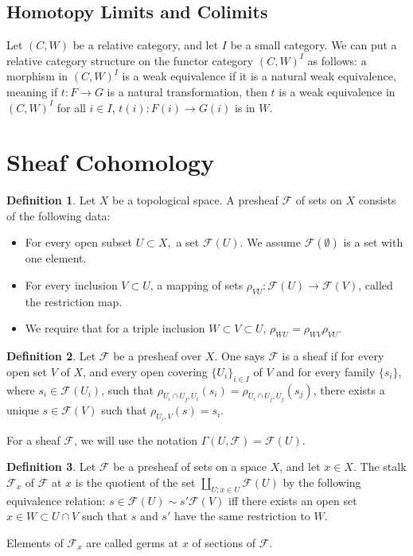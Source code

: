 \documentclass{article}
\theoremstyle{definition}
\newtheorem{defn}{Definition}[section]
\begin{document}
\subsection{Homotopy Limits and Colimits}
Let $(C,W)$ be a relative category, and let $I$ be a small category. We can put a relative category structure on the functor category $(C,W)^{I}$ as follows: a morphism in $(C,W)^{I}$ is a weak equivalence if it is a natural weak equivalence, meaning if $t:F\rightarrow G$ is a natural transformation, then $t$ is a weak equivalence in $(C,W)^{I}$ for all $i\in I$, $t(i):F(i)\rightarrow G(i)$ is in $W$. 
    \section{Sheaf Cohomology}
    \begin{defn}
    Let $X$ be a topological space. A presheaf $\mathcal{F}$ of sets on $X$ consists of the following data:
    \begin{itemize}
    \item For every open subset $U\subset X,$ a set $\mathcal{F}(U).$ We assume $\mathcal{F}(\emptyset)$ is a set with one element. 
    \item For every inclusion $V\subset U$, a mapping of sets $\rho_{VU}:\mathcal{F}(U)\rightarrow\mathcal{F}(V)$, called the restriction map.
    \item We require that for a triple inclusion $W\subset V\subset U$, $\rho_{WU}=\rho_{WV}\rho_{VU}.$
    \end{itemize}
    \end{defn}
    
    \begin{defn}
    Let $\mathcal{F}$ be a presheaf over $X$. One says $\mathcal{F}$ is a sheaf if for every open set $V$ of $X$, and every open covering $\{U_{i}\}_{i\in I}$ of $V$ and for every family $\{s_{i}\}$, where $s_{i}\in\mathcal{F}(U_{i})$, such that $\rho_{U_{i}\cap U_{j},U_{i}}(s_{i})=\rho_{U_{i}\cap U_{j},U_{j}}(s_{j})$, there exists a unique $s\in\mathcal{F}(V)$ such that $\rho_{U_{i},V}(s)=s_{i}.$
    \end{defn}
    
    For a sheaf $\mathcal{F}$, we will use the notation $\Gamma(U,\mathcal{F})=\mathcal{F}(U).$
    
    \begin{defn}
    Let $\mathcal{F}$ be a presheaf of sets on a space $X$, and let $x\in X.$ The stalk $\mathcal{F}_{x}$ of $\mathcal{F}$ at $x$ is the quotient of the set $\amalg_{U:x\in U}\mathcal{F}(U)$ by the following equivalence relation: $s\in\mathcal{F}(U)\sim s'\mathcal{F}(V)$ iff there exists an open set $x\in W\subset U\cap V$ such that $s$ and $s'$ have the same restriction to $W$.
    \end{defn}
    Elements of $\mathcal{F}_{x}$ are called germs at $x$ of sections of $\mathcal{F}$.
    
    
\end{document}
